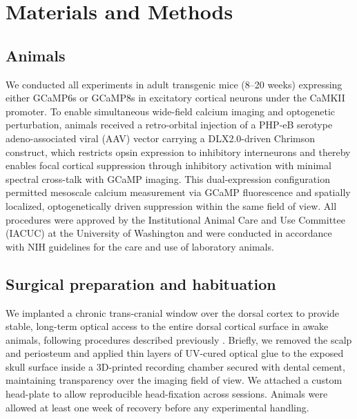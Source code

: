 \section*{Materials and Methods}

\subsection*{Animals}

We conducted all experiments in adult transgenic mice (8--20 weeks)
expressing either GCaMP6s or GCaMP8s in excitatory cortical neurons
under the CaMKII promoter. To enable simultaneous wide-field calcium
imaging and optogenetic perturbation, animals received a retro-orbital
injection of a PHP-eB serotype adeno-associated viral (AAV) vector
carrying a DLX2.0-driven Chrimson construct, which restricts opsin
expression to inhibitory interneurons and thereby enables focal cortical
suppression through inhibitory activation with minimal spectral
cross-talk with GCaMP imaging. This dual-expression configuration
permitted mesoscale calcium measurement via GCaMP fluorescence and
spatially localized, optogenetically driven suppression within the same
field of view. All procedures were approved by the Institutional Animal
Care and Use Committee (IACUC) at the University of Washington and were
conducted in accordance with NIH guidelines for the care and use of
laboratory animals.

\subsection*{Surgical preparation and habituation}

We implanted a chronic trans-cranial window over the dorsal cortex to
provide stable, long-term optical access to the entire dorsal cortical
surface in awake animals, following procedures described previously
\citep{Matveev2024}. Briefly, we removed the scalp and periosteum and
applied thin layers of UV-cured optical glue to the exposed skull
surface inside a 3D-printed recording chamber secured with dental
cement, maintaining transparency over the imaging field of view. We
attached a custom head-plate to allow reproducible head-fixation across
sessions. Animals were allowed at least one week of recovery before any
experimental handling.

